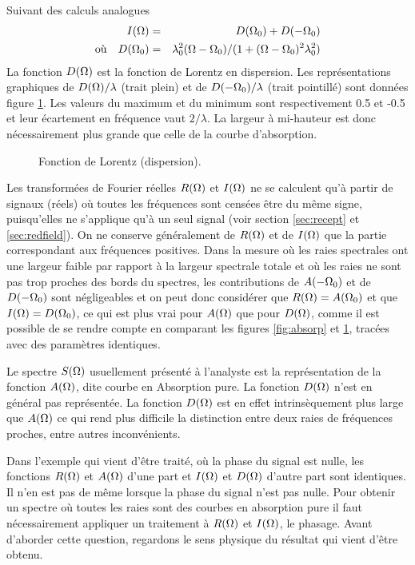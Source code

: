 Suivant des calculs analogues
\begin{eqnarray}
I(\Omega) & = & D(\Omega_0) + D(-\Omega_0) \\
\mbox{où}\quad D(\Omega_0) & = & \lambda_0^2(\Omega - \Omega_0)/
(1 + (\Omega - \Omega_0)^2\lambda_0^2) 
\end{eqnarray}
La fonction $D(\Omega)$ est la fonction de Lorentz en dispersion.
Les représentations graphiques de $D(\Omega)/\lambda$ (trait plein)
et de $D(-\Omega_0)/\lambda$ (trait pointillé) sont données 
figure \ref{fig:dispers}.
Les valeurs du maximum et du minimum sont respectivement 0.5 et -0.5 et leur
écartement en fréquence vaut $2/\lambda$.
La largeur à mi-hauteur est donc nécessairement plus grande que celle
de la courbe d'absorption.

\begin{figure}[hbt]
\begin{center}
\end{center}
\caption{\label{fig:dispers}Fonction de Lorentz (dispersion).}
\end{figure}

Les transformées de Fourier réelles $R(\Omega)$ et $I(\Omega)$ 
ne se calculent qu'à partir de signaux (réels) où toutes les 
fréquences sont censées être du même signe, puisqu'elles ne s'applique qu'à un seul 
signal (voir section \ref{sec:recept} et \ref{sec:redfield}).
On ne conserve généralement de $R(\Omega)$ et de $I(\Omega)$ que la partie 
correspondant aux fréquences positives. 
Dans la mesure où les raies spectrales ont une largeur faible par rapport à
la largeur spectrale totale et où les raies ne sont pas
trop proches des bords du spectres, les contributions de $A(-\Omega_0)$ et de 
$D(-\Omega_0)$ sont négligeables et on peut donc considérer que 
$R(\Omega) = A(\Omega_0)$ et que $I(\Omega) = D(\Omega_0)$,
ce qui est plus vrai pour $A(\Omega)$ que pour $D(\Omega)$, comme il
est possible de se rendre compte en comparant les figures
\ref{fig:absorp} et \ref{fig:dispers}, tracées avec des paramètres identiques.

Le spectre $S(\Omega)$ usuellement présenté à l'analyste est la représentation de la fonction 
$A(\Omega)$, dite courbe en Absorption pure. 
La fonction $D(\Omega)$ n'est en général pas 
représentée.
La fonction $D(\Omega)$ est en effet intrinsèquement plus large que $A(\Omega)$
ce qui rend plus difficile la distinction entre deux raies de fréquences proches,
entre autres inconvénients.

Dans l'exemple qui vient d'être traité, où la phase du signal est nulle, 
les fonctions $R(\Omega)$ et $A(\Omega)$ d'une 
part et $I(\Omega)$ et $D(\Omega)$ d'autre part sont identiques. 
Il n'en est pas de même lorsque la phase du signal n'est pas nulle. 
Pour obtenir un spectre où toutes les raies sont des 
courbes en absorption pure il faut nécessairement appliquer un
traitement à $R(\Omega)$ et $I(\Omega)$, le phasage.
Avant d'aborder cette question, regardons le sens physique du résultat qui vient d'être obtenu.

